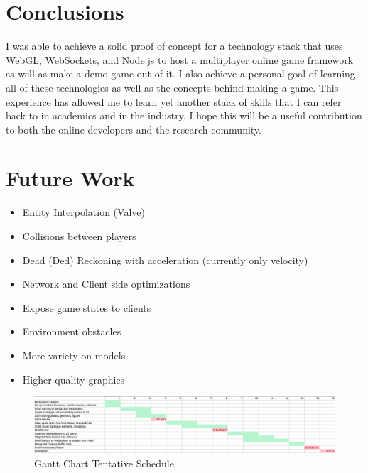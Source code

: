 \documentclass{acmsiggraph}
\begin{document}
\section{Conclusions}
    I was able to achieve a solid proof of concept for a technology stack that uses WebGL, WebSockets, and Node.js to host a multiplayer online game framework as well as make a demo game out of it. I also achieve a personal goal of learning all of these technologies as well as the concepts behind making a game. This experience has allowed me to learn yet another stack of skills that I can refer back to in academics and in the industry. I hope this will be a useful contribution to both the online developers and the research community.

\section{Future Work}
\begin{itemize}
    \item{Entity Interpolation (Valve)}
    \item{Collisions between players}
    \item{Dead (Ded) Reckoning with acceleration (currently only velocity)}
    \item{Network and Client side optimizations}
    \item{Expose game states to clients}
    \item{Environment obstacles}
    \item{More variety on models}
    \item{Higher quality graphics}
\end{itemize}




\nocite{*}
\begin{figure}[ht!]
\centering
\includegraphics[width=7.5in]{chen_gianni_gantt.eps}
\caption{Gantt Chart Tentative Schedule}
\end{figure}
\end{document}
